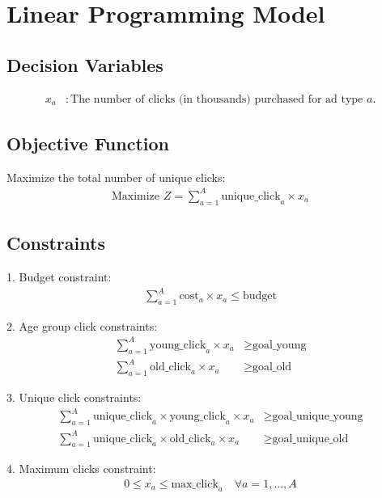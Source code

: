 \documentclass{article}
\begin{document}
\section*{Linear Programming Model}

\subsection*{Decision Variables}
\begin{align*}
x_a &: \text{The number of clicks (in thousands) purchased for ad type } a.
\end{align*}

\subsection*{Objective Function}
Maximize the total number of unique clicks:
\begin{align*}
\text{Maximize } Z = \sum_{a=1}^{A} \text{unique\_click}_a \times x_a 
\end{align*}

\subsection*{Constraints}
1. Budget constraint:
\begin{align*}
\sum_{a=1}^{A} \text{cost}_a \times x_a \leq \text{budget}
\end{align*}

2. Age group click constraints:
\begin{align*}
\sum_{a=1}^{A} \text{young\_click}_a \times x_a &\geq \text{goal\_young} \\
\sum_{a=1}^{A} \text{old\_click}_a \times x_a &\geq \text{goal\_old}
\end{align*}

3. Unique click constraints:
\begin{align*}
\sum_{a=1}^{A} \text{unique\_click}_a \times \text{young\_click}_a \times x_a &\geq \text{goal\_unique\_young} \\
\sum_{a=1}^{A} \text{unique\_click}_a \times \text{old\_click}_a \times x_a &\geq \text{goal\_unique\_old}
\end{align*}

4. Maximum clicks constraint:
\begin{align*}
0 \leq x_a \leq \text{max\_click}_a \quad \forall a = 1, \ldots, A
\end{align*}
\end{document}
